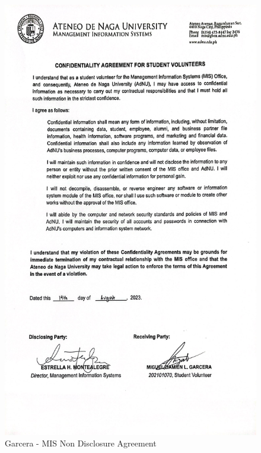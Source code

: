 \begin{figure}[H]
    \centering
    \includegraphics[width=1\textwidth]{figures/images/mis-nda-garcera.JPG}
    \caption{Garcera - MIS Non Disclosure Agreement}
    \label{fig:mis-nda-garcera}
\end{figure}
